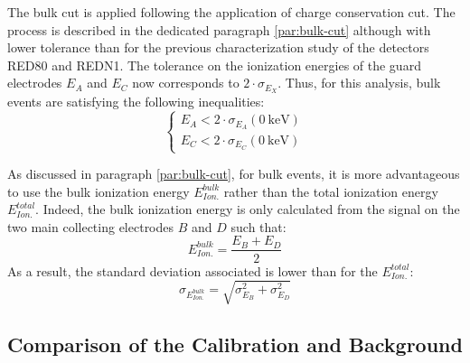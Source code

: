 The bulk cut is applied following the application of charge conservation cut. The process is described in the dedicated paragraph \ref{par:bulk-cut} although with lower tolerance than for the previous characterization study of the detectors RED80 and REDN1. The tolerance on the ionization energies of the guard electrodes $E_A$ and $E_C$ now corresponds to $2 \cdot \sigma_{E_{X}}$. Thus, for this analysis, bulk events are satisfying the following inequalities:
\begin{equation}
\begin{cases}
E_A < 2 \cdot \sigma_{E_A} \left( \SI{0}{\kilo\eV} \right) \\
E_C < 2 \cdot \sigma_{E_C} \left( \SI{0}{\kilo\eV} \right) 
\end{cases}
\end{equation}

As discussed in paragraph \ref{par:bulk-cut}, for bulk events, it is more advantageous to use the bulk ionization energy $E_{Ion.}^{bulk}$ rather than the total ionization energy $E_{Ion.}^{total}$. Indeed, the bulk ionization energy is only calculated from the signal on the two main collecting electrodes $B$ and $D$ such that:
\begin{equation}
E_{Ion.}^{bulk} = \frac{E_B + E_D}{2}
\end{equation}
As a result, the standard deviation associated is lower than for the $E_{Ion.}^{total}$:
\begin{equation}
\sigma_{E_{Ion.}^{bulk}} = \sqrt{ \sigma_{E_B}^2 + \sigma_{E_D}^2  }
\end{equation}

%
\subsection{Comparison of the Calibration and Background}
\label{par:comparison-background-calibration}

